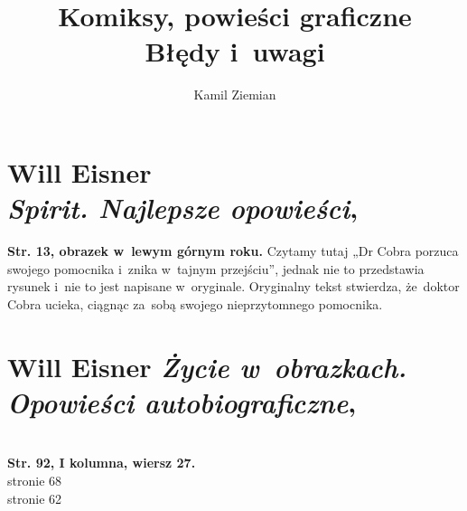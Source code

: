 \documentclass[a4paper,11pt]{article}
\title{Komiksy, powieści graficzne \\
  {\Large Błędy i~uwagi}}
\author{Kamil Ziemian}
\begin{document}





\maketitle %





\section{ %
  Will Eisner \\
  \textit{Spirit. Najlepsze opowieści},
  \parencite{Eisner-Spirit-Najlepsze-opowiesci-Pub-2009}}




\noindent
\textbf{Str. 13, obrazek w~lewym górnym roku.} Czytamy tutaj „Dr Cobra
porzuca swojego pomocnika i~znika w~tajnym przejściu”, jednak nie to
przedstawia rysunek i~nie to jest napisane w~oryginale. Oryginalny tekst
stwierdza, że~doktor Cobra ucieka, ciągnąc za~sobą swojego nieprzytomnego
pomocnika.












\section{Will Eisner \textit{Życie w~obrazkach. Opowieści
    autobiograficzne},
  \cite{EisnerZycieWObrazkach2009}}




\noindent \\
\textbf{Str. 92, I kolumna, wiersz 27.} \\
\Jest stronie 68 \\
\PowinnoByc stronie 62 \\













\printbibliography





\end{document}
